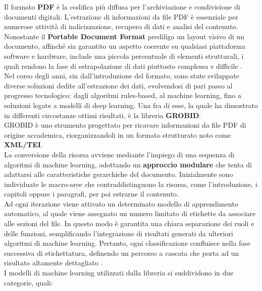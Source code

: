Il formato \textbf{PDF} è la codifica più diffusa per l'archiviazione e condivisione di documenti digitali. L'estrazione di informazioni da file PDF è essenziale per numerose attività di indicizzazione, recupero di dati e analisi del contenuto. Nonostante il \textbf{Portable Document Format} prediliga un layout visivo di un documento, affinché sia garantito un aspetto coerente su qualsiasi piattaforma software e hardware, include una piccola percentuale di elementi strutturali, i quali rendono la fase di estrapolazione di dati piuttosto complessa e difficile \cite{2023arXiv230309957M}. \vspace{7pt} \\
Nel corso degli anni, sin dall'introduzione del formato, sono state sviluppate diverse soluzioni dedite all'estrazione dei dati, evolvendosi di pari passo al progresso tecnologico: dagli algoritmi rules-based, al machine learning, fino a soluzioni legate a modelli di deep learning. Una fra di esse, la quale ha dimostrato in differenti circostanze ottimi risultati, è la libreria \textbf{GROBID}. \vspace{7pt} \\
GROBID è uno strumento progettato per ricavare informazioni da file PDF di origine accademica, riorganizzandoli in un formato strutturato noto come \textbf{XML/TEI}. \vspace{7pt} \\ 
La conversione della risorsa avviene mediante l'impiego di una sequenza di algoritmi di machine learning, adottando un \textbf{approccio modulare} che tenta di adattarsi alle caratteristiche gerarchiche del documento. Inizialmente sono individuate le macro-aree che contraddistinguono la risorsa, come l'introduzione, i capitoli oppure i paragrafi, per poi estrarne il contenuto. \vspace{7pt} \\ 
Ad ogni iterazione viene attivato un determinato modello di apprendimento automatico, al quale viene assegnato un numero limitato di etichette da associare alle sezioni del file. In questo modo è garantita una chiara separazione dei ruoli e delle funzioni, semplificando l'integrazione di risultati generati da ulteriori algoritmi di machine learning. Pertanto, ogni classificazione confluisce nella fase successiva di etichettatura, definendo un percorso a cascata che porta ad un risultato altamente dettagliato \cite{grobid2024}. \vspace{7pt} \\ 
I modelli di machine learning utilizzati dalla libreria si suddividono in due categorie, quali:
